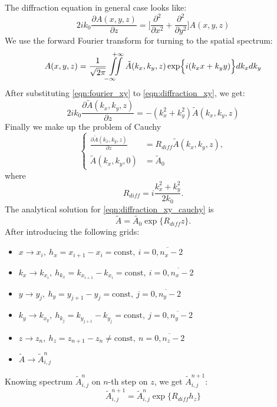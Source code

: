\documentclass[a4paper, 12pt]{article}
\begin{document}
The diffraction equation in general case looks like:
\begin{equation}
\label{eqn:diffraction_xy}
2 i k_0 \frac{\partial A (x, y, z)}{\partial z} = \biggl[ \frac{\partial^2}{\partial x^2} + \frac{\partial^2}{\partial y^2} \biggr] A (x, y, z)
\end{equation}
We use the forward Fourier transform for turning to the spatial spectrum:
\begin{equation}
\label{eqn:fourier_xy}
A(x,y,z) = \frac1{\sqrt{2 \pi}}\iint\limits_{-\infty \quad}^{\quad+\infty} \tilde{A}(k_x, k_y, z) \exp \Bigl\{ i (k_x x + k_y y) \Bigr\} dk_x dk_y
\end{equation}
After substituting \eqref{eqn:fourier_xy} to \eqref{eqn:diffraction_xy}, we get:
\begin{equation}
2 i k_0 \frac{\partial \tilde{A} (k_x, k_y, z)}{\partial z} = -(k_x^2 + k_y^2) \tilde{A}(k_x, k_y, z)
\end{equation}
Finally we make up the problem of Cauchy
\begin{equation}
\label{eqn:diffraction_xy_cauchy}
\left\{
\begin{aligned}
\frac{\partial \tilde{A} (k_x, k_y, z)}{\partial z} &= R_{diff} \tilde{A} (k_x, k_y, z),\\
\tilde{A}(k_x, k_y, 0) &= \tilde{A}_0
\end{aligned}
\right.
\end{equation}
where
\begin{equation}
R_{diff} = i\frac{k_x^2 + k_y^2}{2 k_0}.
\end{equation}
The analytical solution for \eqref{eqn:diffraction_xy_cauchy} is
\begin{equation}
\tilde{A} = \tilde{A_0} \exp\{R_{diff} z\}.
\end{equation}
After introducing the following grids:
\begin{itemize}
\item $x\longrightarrow x_i, \ h_x = x_{i+1} - x_{i} = \text{const}, \ i = \overline{0, n_x-2}$
\item $k_x\longrightarrow k_{x_i}, \ h_{k_x} = k_{x_{i+1}} - k_{x_{i}} = \text{const}, \ i = \overline{0, n_x-2}$
\item $y\longrightarrow y_j, \ h_y = y_{j+1} - y_{j} = \text{const}, \ j = \overline{0, n_y-2}$
\item $k_y\longrightarrow k_{x_y}, \ h_{k_j} = k_{y_{j+1}} - k_{y_{j}} = \text{const}, \ j = \overline{0, n_y-2}$
\item $z\longrightarrow z_n, \ h_z = z_{n+1} - z_{n} \ne \text{const}, \ n = \overline{0, n_z-2}$
\item $\tilde{A} \longrightarrow \tilde{A}^n_{i, j}$
\end{itemize}
Knowing spectrum $\tilde{A}^n_{i,j}$ on $n$-th step on $z$, we get $\tilde{A}^{n+1}_{i,j}$:
\begin{equation}
\tilde{A}^{n+1}_{i,j} = \tilde{A}^n_{i,j} \exp\{R_{diff} h_z \}
\end{equation}
\end{document}
